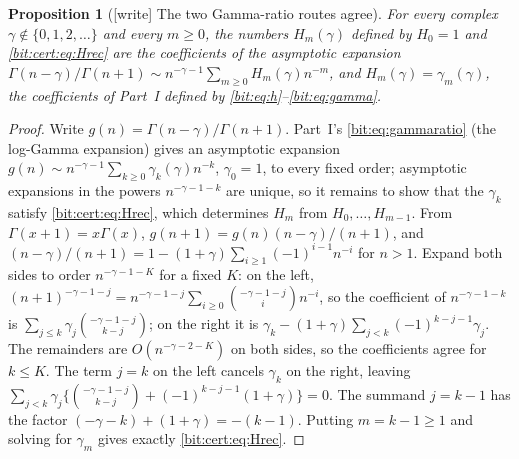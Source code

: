 \documentclass[11pt]{article}
\newtheorem{proposition}[theorem]{Proposition}
\theoremstyle{definition}\newtheorem{definition}[theorem]{Definition}
\theoremstyle{remark}\newtheorem{remark}[theorem]{Remark}
\begin{document}
\begin{proposition}[\textsf{[write]} The two Gamma-ratio routes agree]\label{bit:cert:prop:hgamma}
For every complex $\gamma\notin\{0,1,2,\ldots\}$ and every $m\ge0$, the
numbers $H_m(\gamma)$ defined by $H_0=1$ and \eqref{bit:cert:eq:Hrec} are the
coefficients of the asymptotic expansion
$\Gamma(n-\gamma)/\Gamma(n+1)\sim n^{-\gamma-1}\sum_{m\ge0}H_m(\gamma)n^{-m}$,
and $H_m(\gamma)=\gamma_m(\gamma)$, the coefficients of Part~I defined by
\eqref{bit:eq:h}--\eqref{bit:eq:gamma}.
\end{proposition}
\begin{proof}
Write $g(n)=\Gamma(n-\gamma)/\Gamma(n+1)$. Part~I's \eqref{bit:eq:gammaratio}
(the log-Gamma expansion) gives an asymptotic expansion
$g(n)\sim n^{-\gamma-1}\sum_{k\ge0}\gamma_k(\gamma)n^{-k}$, $\gamma_0=1$, to
every fixed order; asymptotic expansions in the powers $n^{-\gamma-1-k}$ are
unique, so it remains to show that the $\gamma_k$ satisfy
\eqref{bit:cert:eq:Hrec}, which determines $H_m$ from $H_0,\ldots,H_{m-1}$.
From $\Gamma(x+1)=x\Gamma(x)$, $g(n+1)=g(n)(n-\gamma)/(n+1)$, and
$(n-\gamma)/(n+1)=1-(1+\gamma)\sum_{i\ge1}(-1)^{i-1}n^{-i}$ for $n>1$. Expand
both sides to order $n^{-\gamma-1-K}$ for a fixed $K$: on the left,
$(n+1)^{-\gamma-1-j}=n^{-\gamma-1-j}\sum_{i\ge0}\binom{-\gamma-1-j}{i}n^{-i}$,
so the coefficient of $n^{-\gamma-1-k}$ is
$\sum_{j\le k}\gamma_j\binom{-\gamma-1-j}{k-j}$; on the right it is
$\gamma_k-(1+\gamma)\sum_{j<k}(-1)^{k-j-1}\gamma_j$. The remainders are
$O(n^{-\gamma-2-K})$ on both sides, so the coefficients agree for $k\le K$.
The term $j=k$ on the left cancels $\gamma_k$ on the right, leaving
$\sum_{j<k}\gamma_j\bigl\{\binom{-\gamma-1-j}{k-j}+(-1)^{k-j-1}(1+\gamma)\bigr\}=0$.
The summand $j=k-1$ has the factor $(-\gamma-k)+(1+\gamma)=-(k-1)$. Putting
$m=k-1\ge1$ and solving for $\gamma_m$ gives exactly \eqref{bit:cert:eq:Hrec}.
\end{proof}
\end{document}
